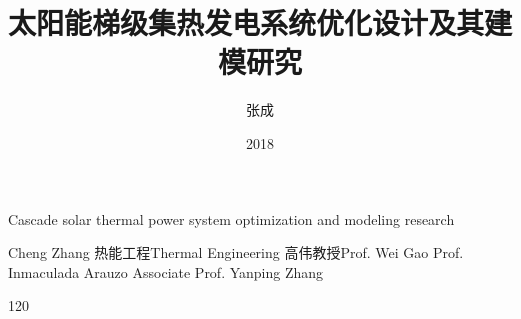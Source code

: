 \makenomenclature

\title{太阳能梯级集热发电系统优化设计及其建模研究}{Cascade solar thermal power system optimization and modeling research}
\author
{张成}{Cheng Zhang}
\major
{热能工程}{Thermal Engineering}
\supervisor
{高伟\hspace{0.2em}教授}{Prof. Wei Gao \newline Prof. Inmaculada Arauzo \newline Associate Prof. Yanping Zhang}
\date{2018}{1}{20}
